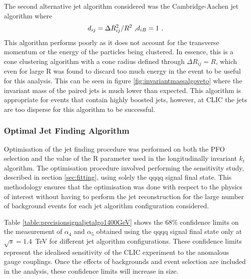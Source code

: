 The second alternative jet algorithm considered was the Cambridge-Aachen jet algorithm \cite{Dokshitzer:1997in} where 
%
\begin{equation}
d_{ij} = {\Delta}R_{ij}^{2}/R^2 \text{ ,} \\
d_{iB} = 1 \text{ .}
\end{equation}
%
\noindent This algorithm performs poorly as it does not account for the transverse momentum or the energy of the particles being clustered. In essence, this is a cone clustering algorithm with a cone radius defined through ${\Delta}R_{ij} = R$, which even for large R was found to discard too much energy in the event to be useful for this analysis.  This can be seen in figure \ref{fig:invariantmassalgoveto} where the invariant mass of the paired jets is much lower than expected.  This algorithm is appropriate for events that contain highly boosted jets, however, at CLIC the jets are too disperse for this algorithm to be successful.


\subsubsection{Optimal Jet Finding Algorithm}
\label{sec:optimaljetalgorithm}
Optimisation of the jet finding procedure was performed on both the PFO selection and the value of the R parameter used in the longitudinally invariant $k_{t}$ algorithm.  The optimisation procedure involved performing the sensitivity study, described in section \ref{sec:fitting}, using solely the {\nu}{\nu}qqqq signal final state.  This methodology ensures that the optimisation was done with respect to the physics of interest without having to perform the jet reconstruction for the large number of background events for each jet algorithm configuration considered. 

Table \ref{table:precisionsignaljetalgo1400GeV} shows the 68\% confidence limits on the measurement of $\alpha_{4}$ and $\alpha_{5}$ obtained using the {\nu}{\nu}qqqq signal final state only at $\sqrt{s} = 1.4$~TeV for different jet algorithm configurations.  These confidence limits represent the idealised sensitivity of the CLIC experiment to the anomalous gauge couplings.  Once the effects of backgrounds and event selection are included in the analysis, these confidence limits will increase in size.

